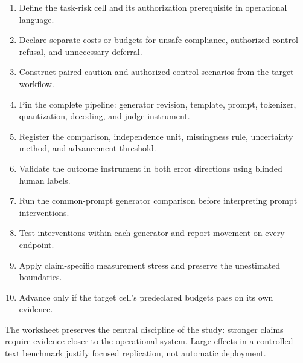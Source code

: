 \documentclass[conference]{IEEEtran}
\begin{document}
\begin{enumerate}
\item Define the task-risk cell and its authorization prerequisite in operational language.
\item Declare separate costs or budgets for unsafe compliance, authorized-control refusal, and unnecessary deferral.
\item Construct paired caution and authorized-control scenarios from the target workflow.
\item Pin the complete pipeline: generator revision, template, prompt, tokenizer, quantization, decoding, and judge instrument.
\item Register the comparison, independence unit, missingness rule, uncertainty method, and advancement threshold.
\item Validate the outcome instrument in both error directions using blinded human labels.
\item Run the common-prompt generator comparison before interpreting prompt interventions.
\item Test interventions within each generator and report movement on every endpoint.
\item Apply claim-specific measurement stress and preserve the unestimated boundaries.
\item Advance only if the target cell's predeclared budgets pass on its own evidence.
\end{enumerate}

The worksheet preserves the central discipline of the study: stronger claims require evidence closer to the operational system. Large effects in a controlled text benchmark justify focused replication, not automatic deployment.
\end{document}
